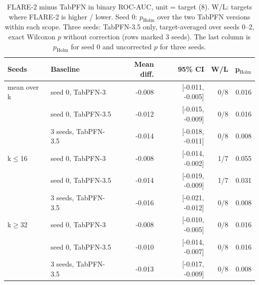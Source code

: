 \documentclass[pdflatex,sn-mathphys-num]{sn-jnl}%
\begin{document}
\begin{table}[htbp]
\centering\small
\caption{FLARE-2 minus TabPFN in binary ROC-AUC, unit = target (8). W/L: targets where FLARE-2 is higher / lower. Seed 0: $p_{\text{Holm}}$ over the two TabPFN versions within each scope. Three seeds: TabPFN-3.5 only, target-averaged over seeds 0--2, exact Wilcoxon $p$ without correction (rows marked 3 seeds). The last column is $p_{\text{Holm}}$ for seed 0 and uncorrected $p$ for three seeds.}\label{tab:tabpfn}
{\scriptsize\setlength{\tabcolsep}{2.5pt}\begin{tabular}{llrrrr}
\toprule
Seeds & Baseline & Mean diff. & 95\% CI & W/L & p$_{\text{Holm}}$ \\
\midrule
mean over k & seed 0, TabPFN-3 & -0.008 & [-0.011, -0.005] & 0/8 & 0.016 \\
 & seed 0, TabPFN-3.5 & -0.012 & [-0.015, -0.009] & 0/8 & 0.016 \\
 & 3 seeds, TabPFN-3.5 & -0.014 & [-0.018, -0.011] & 0/8 & 0.008 \\
\midrule
k$\leq$16 & seed 0, TabPFN-3 & -0.008 & [-0.014, -0.002] & 1/7 & 0.055 \\
 & seed 0, TabPFN-3.5 & -0.014 & [-0.019, -0.009] & 1/7 & 0.031 \\
 & 3 seeds, TabPFN-3.5 & -0.016 & [-0.021, -0.012] & 0/8 & 0.008 \\
\midrule
k$\geq$32 & seed 0, TabPFN-3 & -0.008 & [-0.010, -0.005] & 0/8 & 0.016 \\
 & seed 0, TabPFN-3.5 & -0.010 & [-0.014, -0.007] & 0/8 & 0.016 \\
 & 3 seeds, TabPFN-3.5 & -0.013 & [-0.017, -0.009] & 0/8 & 0.008 \\
\bottomrule
\end{tabular}}
\end{table}
\end{document}
